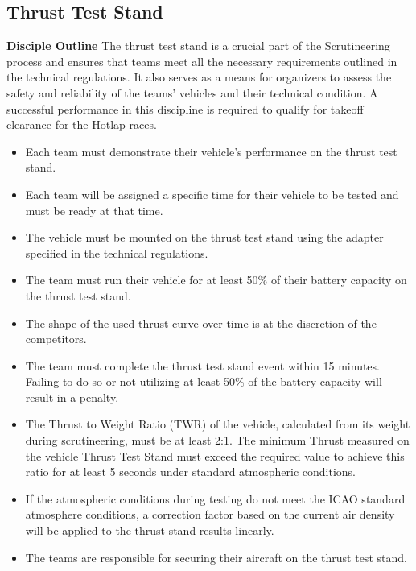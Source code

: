     \subsection{Thrust Test Stand}
    \textbf{Disciple Outline}
    The thrust test stand is a crucial part of the Scrutineering process and ensures that teams meet all the necessary requirements outlined in the technical regulations. It also serves as a means for organizers to assess the safety and reliability of the teams' vehicles and their technical condition. A successful performance in this discipline is required to qualify for takeoff clearance for the Hotlap races.
    \begin{itemize}
      \item Each team must demonstrate their vehicle's performance on the thrust test stand.
      \item Each team will be assigned a specific time for their vehicle to be tested and must be ready at that time.
      \item The vehicle must be mounted on the thrust test stand using the adapter specified in the technical regulations.
      \item The team must run their vehicle for at least 50\% of their battery capacity on the thrust test stand.
      \item The shape of the used thrust curve over time is at the discretion of the competitors.
      \item The team must complete the thrust test stand event within 15 minutes. Failing to do so or not utilizing at least 50\% of the battery capacity will result in a penalty.
      \item The Thrust to Weight Ratio (TWR) of the vehicle, calculated from its weight during scrutineering, must be at least 2:1. The minimum Thrust measured on the vehicle Thrust Test Stand must exceed the required value to achieve this ratio for at least 5 seconds under standard atmospheric conditions.
      \item If the atmospheric conditions during testing do not meet the ICAO standard atmosphere conditions, a correction factor based on the current air density will be applied to the thrust stand results linearly.
      \item The teams are responsible for securing their aircraft on the thrust test stand.
      \end{itemize}




